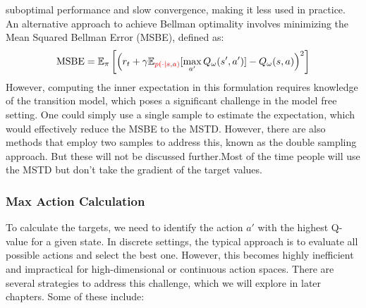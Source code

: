  suboptimal performance and slow convergence, making it less used in practice.\newline
  An alternative approach to achieve Bellman optimality involves minimizing the Mean Squared 
  Bellman Error (MSBE), defined as:
  $$\text{MSBE} = \mathbb{E}_\pi\left[\left(r_t+ \gamma\mathbb{E}_{\color{red}p(\cdot|s, 
  a)}[\max\limits_{a'}Q_\omega(s',a')]-Q_\omega(s,a)\right)^2\right] \label{MSBE}$$
  However, computing the inner expectation in this formulation requires knowledge of the transition model,
  which poses a significant challenge in the model free setting. One could simply use a single sample to 
  estimate the expectation, which would effectively reduce the MSBE to the MSTD. However, there are also 
  methods that employ two samples to address this, known as the double sampling approach. 
  But these will not be discussed further.\newline Most of the time people will use the MSTD but don't take the gradient of 
  the target values.

  \subsubsection{Max Action Calculation}
  To calculate the targets, we need to identify the action $a'$ with the highest Q-value for a given state. 
  In discrete settings, the typical approach is to evaluate all possible actions and select the best one. 
  However, this becomes highly inefficient and impractical for high-dimensional or continuous action spaces. 
  There are several strategies to address this challenge, which we will explore in later chapters. Some of these include:

